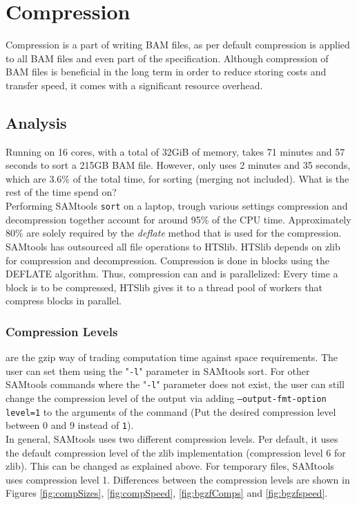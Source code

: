 \section{Compression} 
Compression is a part of writing BAM files, as per default compression is applied to all BAM files and even part of the specification. Although compression of BAM files is beneficial in the long term in order to reduce storing costs and transfer speed, it comes with a significant resource overhead. 

\subsection{Analysis}
Running on 16 cores, with a total of 32GiB of memory, \sort takes 71 minutes and 57 seconds to sort a 215GB BAM file. However, \sort only uses 2 minutes and 35 seconds, which are 3.6\% of the total time, for sorting (merging not included). What is the rest of the time spend on? \\ 
Performing SAMtools \texttt{sort} on a laptop, trough various settings compression and decompression together account for around 95\% of the CPU time. Approximately 80\% are solely required by the \textit{deflate} method that is used for the compression. \\
SAMtools has outsourced all file operations to HTSlib. HTSlib depends on zlib for compression and decompression. Compression is done in blocks using the DEFLATE algorithm. Thus, compression can and is parallelized: Every time a block is to be compressed, HTSlib gives it to a thread pool of workers that compress blocks in parallel.


\subsubsection{Compression Levels} are  the gzip way of trading computation time against space requirements. The user can set them using the "\texttt{-l}" parameter in SAMtools sort. For other SAMtools commands where the "\texttt{-l}" parameter does not exist, the user can still change the compression level of the output via adding \texttt{--output-fmt-option level=1} to the arguments of the command (Put the desired compression level between 0 and 9 instead of \texttt{1}). \\
In general, SAMtools uses two different compression levels. Per default, it uses the default compression level of the zlib implementation (compression level 6 for zlib). This can be changed as explained above. For temporary files, SAMtools uses compression level 1.
Differences between the compression levels are shown in Figures \ref{fig:compSizes}, \ref{fig:compSpeed}, \ref{fig:bgzfComps} and \ref{fig:bgzfspeed}.

